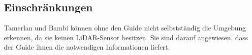 \subsection{Einschränkungen}
Tamerlan und Bambi können ohne den Guide nicht selbstständig die Umgebung erkennen, da sie keinen LiDAR-Sensor besitzen. Sie sind darauf angewiesen, dass der Guide ihnen die notwendigen Informationen liefert.
